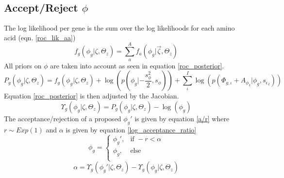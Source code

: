 \documentclass[11pt]{article}
\begin{document}
  \subsection{Accept/Reject $\phi$}
  The log likelihood per gene is the sum over the log likelihoods for each amino acid (eqn. \ref{roc_lik_aa})
  \begin{equation}
    f_g(\phi_g|\zeta, \Theta_z) = \sum_a^A f_a(\phi_g|\vec{\zeta}, \Theta_z)
    \label{roc_lik_gene}
  \end{equation}
  All priors on $\phi$ are taken into account as seen in equation \ref{roc_posterior}.
  \begin{equation}
    P_g(\phi_g|\zeta, \Theta_z) = f_g(\phi_g|\zeta, \Theta_z) + \log(p(\phi_g|-\frac{s_{\phi}^2}{2}, s_{\phi})) + \sum_{\iota}^I \log(p(\Phi_{g,\iota} + {A_{\phi}}_{\iota}| \phi_g, {s_{\epsilon}}_{\iota}))
    \label{roc_posterior}
  \end{equation}
  Equation \ref{roc_posterior} is then adjusted by the Jacobian.
  \begin{equation}
    \Upsilon_g(\phi_g|\zeta, \Theta_z) = P_g(\phi_g|\zeta, \Theta_z) - \log(\phi_g)
    \label{roc_posterior_jacobian}
  \end{equation}
  The acceptance/rejection of a proposed $\phi_g'$ is given by equation \ref{a/r} where $r \sim Exp(1)$ and $\alpha$ is given by equation \ref{log_acceptance_ratio}
  \begin{equation}
    \phi_g = 
    \begin{cases}
      \phi_g',	& \text{if } -r < \alpha \\
      \phi_g,	& \text{else } \\
    \end{cases}
     \label{a/r}
  \end{equation}  
  \begin{equation}
    \alpha = \Upsilon_g(\phi_g'|\zeta, \Theta_z) - \Upsilon_g(\phi_g|\zeta, \Theta_z)
    \label{log_acceptance_ratio}
  \end{equation}
  
\end{document}
